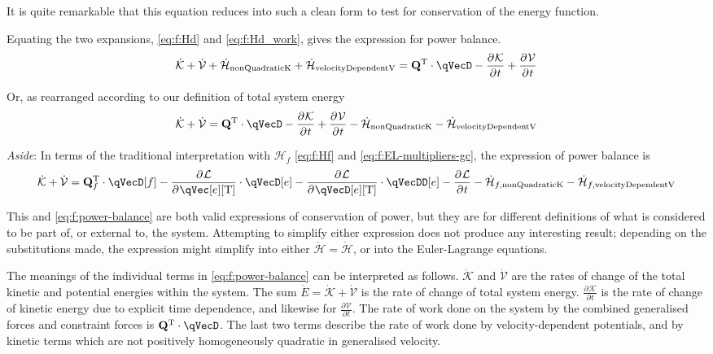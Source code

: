 \documentclass[11pt]{article}
\newcommand{\pD}[2]{
    \frac{\partial\mspace{1mu}#1}{\partial\mspace{1mu}#2}
}
\begin{document}
It is quite remarkable that this equation reduces into such a clean form to test for conservation of the energy function.

Equating the two expansions, \eqref{eq:f:Hd} and \eqref{eq:f:Hd_work}, gives the expression for power balance.
\begin{equation}
    \dot{\mathcal{K}} + \dot{\mathcal{V}} + \dot{\mathcal{H}}_{\mathrm{nonQuadraticK}} + \dot{\mathcal{H}}_{\mathrm{velocityDependentV}}
    = \mathbf{Q}^{\mathrm{T}} \cdot \qVecD - \pD{\mathcal{K}}{t} + \pD{\mathcal{V}}{t}
\end{equation}

Or, as rearranged according to our definition of total system energy
\begin{equation} \label{eq:f:power-balance}
    \dot{\mathcal{K}} + \dot{\mathcal{V}}
    = \mathbf{Q}^{\mathrm{T}} \cdot \qVecD - \pD{\mathcal{K}}{t} + \pD{\mathcal{V}}{t} - \dot{\mathcal{H}}_{\mathrm{nonQuadraticK}} - \dot{\mathcal{H}}_{\mathrm{velocityDependentV}}
\end{equation}

\textit{Aside}: In terms of the traditional interpretation with $\mathcal{H}_f$ \eqref{eq:f:Hf} and \eqref{eq:f:EL-multipliers-gc}, the expression of power balance is
\begin{equation}
    \dot{\mathcal{K}} + \dot{\mathcal{V}}
    = \mathbf{Q}_f^{\mathrm{T}} \cdot \qVecD[f]
        - \pD{\mathcal{L}}{\qVec[e][\mathrm{T}]} \cdot \qVecD[e]
        - \pD{\mathcal{L}}{\qVecD[e][\mathrm{T}]} \cdot \qVecDD[e]
        - \pD{\mathcal{L}}{t}
        - \dot{\mathcal{H}}_{f,\mathrm{nonQuadraticK}}
        - \dot{\mathcal{H}}_{f,\mathrm{velocityDependentV}}
\end{equation}

This and \eqref{eq:f:power-balance} are both valid expressions of conservation of power, but they are for different definitions of what is considered to be part of, or external to, the system. Attempting to simplify either expression does not produce any interesting result; depending on the substitutions made, the expression might simplify into either $\dot{\mathcal{H}}=\dot{\mathcal{H}}$, or into the Euler-Lagrange equations.

The meanings of the individual terms in \eqref{eq:f:power-balance} can be interpreted as follows. $\dot{\mathcal{K}}$ and $\dot{\mathcal{V}}$ are the rates of change of the total kinetic and potential energies within the system. The sum $\dot{E}=\dot{\mathcal{K}}+\dot{\mathcal{V}}$ is the rate of change of total system energy. $\pD{\mathcal{K}}{t}$ is the rate of change of kinetic energy due to explicit time dependence, and likewise for $\pD{\mathcal{V}}{t}$. The rate of work done on the system by the combined generalised forces and constraint forces is $\mathbf{Q}^{\mathrm{T}} \cdot \qVecD$. The last two terms describe the rate of work done by velocity-dependent potentials, and by kinetic terms which are not positively homogeneously quadratic in generalised velocity.
\end{document}
